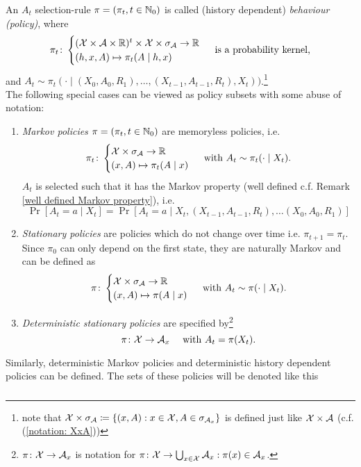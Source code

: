 \begin{definition} 
	An \(A_t\) selection-rule \(\pi=(\pi_t,t\in\mathbb{N}_0)\) is called (history dependent) \emph{behaviour (policy)}, where
	\[ 
		\pi_t\colon
		\begin{cases}
			(\mathcal{X}\times\mathcal{A}\times\mathbb{R})^t\times\mathcal{X}\times\sigma_{\mathcal{A}} \to \mathbb{R} \\
			(h,x,A)\mapsto \pi_t(A\mid h,x)
		\end{cases} \text{ is a probability kernel,}
	\]
	and \(A_t\sim \pi_t(\cdot\mid (X_0,A_0,R_1), \dots,(X_{t-1},A_{t-1},R_t),X_t))\).\footnote{ 
		note that \(\mathcal{X}\times\sigma_{\mathcal{A}}\coloneqq \{(x,A): x\in\mathcal{X}, A\in\sigma_{\mathcal{A}_x} \} \) is defined just like \(\mathcal{X}\times\mathcal{A}\) (c.f. (\ref{notation: XxA}))
	 } \\
	The following special cases can be viewed as policy subsets with some abuse of notation:
	\begin{enumerate}
		\item \emph{Markov policies} \(\pi=(\pi_t,t\in\mathbb{N}_0)\) are memoryless policies, i.e.
		\[
			\pi_t\colon
			\begin{cases}
				\mathcal{X}\times\sigma_{\mathcal{A}} \to \mathbb{R} \\
				(x,A)\mapsto \pi_t(A\mid x)
			\end{cases} 
			\text{ with } A_t\sim \pi_t(\cdot\mid X_t).
		\]
		\(A_t\) is selected such that it has the Markov property (well defined c.f. Remark \ref{well defined Markov property}), i.e.
		\[\Pr[A_t=a\mid X_t]=\Pr[A_t=a\mid X_t, (X_{t-1},A_{t-1},R_t), \dots (X_0,A_0,R_1)] \]
		\item \emph{Stationary policies} are policies which do not change over time i.e. \(\pi_{t+1}=\pi_t\). Since \(\pi_0\) can only depend on the first state, they are naturally Markov and can be defined as
		\[
			\pi\colon 
			\begin{cases}
				\mathcal{X}\times\sigma_{\mathcal{A}}\to\mathbb{R}\\
				(x,A)\mapsto \pi(A\mid x)
			\end{cases} 
			\text{ with } A_t\sim\pi(\cdot\mid X_t).
		\]
		\item \emph{Deterministic stationary policies} are specified by\footnote{
			\(\pi\colon\mathcal{X}\to\mathcal{A}_x\) is notation for \(\pi\colon\mathcal{X}\to\bigcup_{x\in\mathcal{X}} \mathcal{A}_x : \pi(x)\in\mathcal{A}_x \).
		}
		\[
			\pi\colon\mathcal{X}\to\mathcal{A}_x \quad\text{ with }A_t=\pi(X_t).
		\]
	\end{enumerate}
	Similarly, deterministic Markov policies and deterministic history dependent policies can be defined. The sets of these policies will be denoted like this
	\[
	\begin{tikzcd}[row sep = small, column sep = small]

\end{tikzcd}\]
\end{definition}
